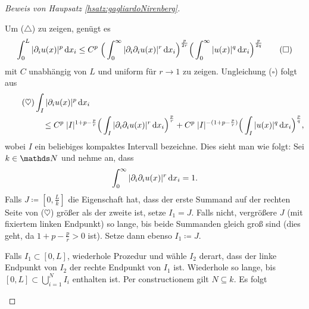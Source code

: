 \begin{proof}[Beweis von Haupsatz \ref{hsatz:gagliardoNirenberg}]
\begin{enumerate}
      Um ($\triangle$) zu zeigen, genügt es
      \begin{align*}
        \int_0^L |\partial_i u(x)|^p \, {\operatorname{d}\!{x}}_i
        \leq C^p \; \Big( \int_0^\infty |\partial_i \partial_i u(x) |^r \, {\operatorname{d}\!{x}}_i \Big)^{\frac{p}{2r}} \Big( \int_0^\infty |u(x)|^q \, {\operatorname{d}\!{x}}_i \Big)^{\frac{p}{2q}}
        \tag{$\square$}
      \end{align*}
      mit $C$ unabhängig von $L$ und uniform für $r \to 1$ zu zeigen.
      Ungleichung ($\square$) folgt aus 
      \begin{align*} 
        \tag{$\heartsuit$}       
        &\int_I |\partial_i u(x)|^p \, {\operatorname{d}\!{x}}_i \\
        &\quad \leq C^p \; |I|^{1 + p - \frac{p}{r}} \Big( \int_I |\partial_i \partial_i u(x)|^r \, {\operatorname{d}\!{x}}_i \Big)^{\frac{p}{r}} + C^p \; |I|^{-(1 + p - \frac{p}{r})} \Big( \int_I |u(x)|^q \, {\operatorname{d}\!{x}}_i \Big)^{\frac{p}{q}},
      \end{align*}
      wobei $I$ ein beliebiges kompaktes Intervall bezeichne.
      Dies sieht man wie folgt: 
      Sei $k \in \N$ und nehme an, dass 
      $$
      \int_0^\infty |\partial_i \partial_i u(x)|^r \, {\operatorname{d}\!{x}}_i = 1.
      $$
      Falls $J \coloneqq [0, \frac{L}{k}]$ die Eigenschaft hat, dass der erste Summand auf der rechten Seite von ($\heartsuit$) größer als der zweite ist, setze $I_1 = J$.
      Falls nicht, vergrößere $J$ (mit fixiertem linken Endpunkt) so lange, bis beide Summanden gleich groß sind (dies geht, da $1 + p - \frac{p}{r} > 0$ ist). 
      Setze dann ebenso $I_1 \coloneqq J$.

      Falls $I_1 \subset [0,L]$, wiederhole Prozedur und wähle $I_2$ derart, dass der linke Endpunkt von $I_2$ der rechte Endpunkt von $I_1$ ist.
      Wiederhole so lange, bis $[0,L] \subset \bigcup_{i = 1}^N I_i$ enthalten ist.
      Per constructionem gilt $N \subseteq k$.
      Es folgt
  \end{enumerate}

\end{proof}

